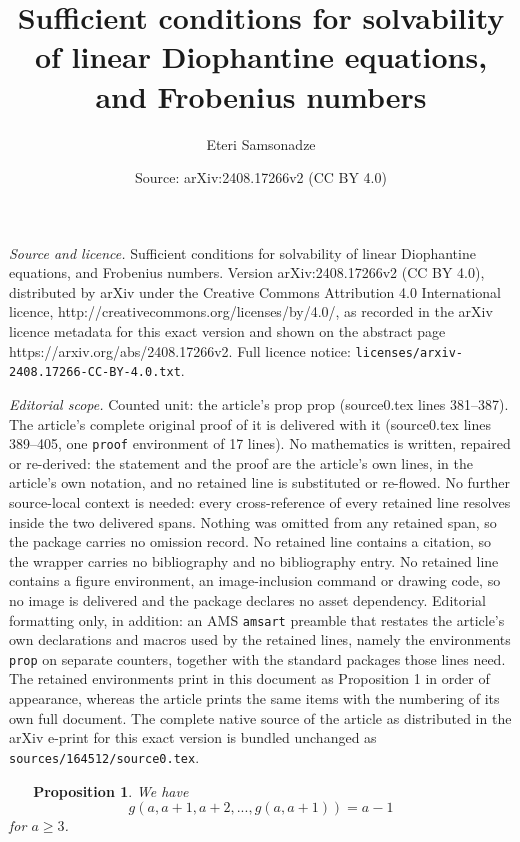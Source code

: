 \documentclass[10pt,a4paper]{amsart}
\title{Sufficient conditions for solvability of linear Diophantine equations, and Frobenius numbers}
\author{Eteri Samsonadze}
\date{Source: arXiv:2408.17266v2 (CC BY 4.0)}
\newtheorem{prop}{\ \ \ Proposition}
\begin{document}
\maketitle

\noindent\emph{Source and licence.} Sufficient conditions for solvability of linear Diophantine equations, and Frobenius numbers. Version arXiv:2408.17266v2 (CC BY 4.0), distributed by arXiv under the Creative Commons Attribution 4.0 International licence, http://creativecommons.org/licenses/by/4.0/, as recorded in the arXiv licence metadata for this exact version and shown on the abstract page https://arxiv.org/abs/2408.17266v2. Full licence notice: \texttt{licenses/arxiv-2408.17266-CC-BY-4.0.txt}.\par\smallskip

\noindent\textit{Editorial scope.} Counted unit: the article's prop prop (source0.tex lines 381--387). The article's complete original proof of it is delivered with it (source0.tex lines 389--405, one \texttt{proof} environment of 17 lines). No mathematics is written, repaired or re-derived: the statement and the proof are the article's own lines, in the article's own notation, and no retained line is substituted or re-flowed.  No further source-local context is needed: every cross-reference of every retained line resolves inside the two delivered spans.  Nothing was omitted from any retained span, so the package carries no omission record.  No retained line contains a citation, so the wrapper carries no bibliography and no bibliography entry.  No retained line contains a figure environment, an image-inclusion command or drawing code, so no image is delivered and the package declares no asset dependency.  Editorial formatting only, in addition: an AMS \texttt{amsart} preamble that restates the article's own declarations and macros used by the retained lines, namely the environments \texttt{prop} on separate counters, together with the standard packages those lines need.  The retained environments print in this document as Proposition 1 in order of appearance, whereas the article prints the same items with the numbering of its own full document.  The complete native source of the article as distributed in the arXiv e-print for this exact version is bundled unchanged as \texttt{sources/164512/source0.tex}.
\begin{prop}
We have
\begin{equation}
g(a,a+1,a+2,...,g(a,a+1))=a-1
\end{equation}
for $a\geq 3$.
\end{prop}
\end{document}
